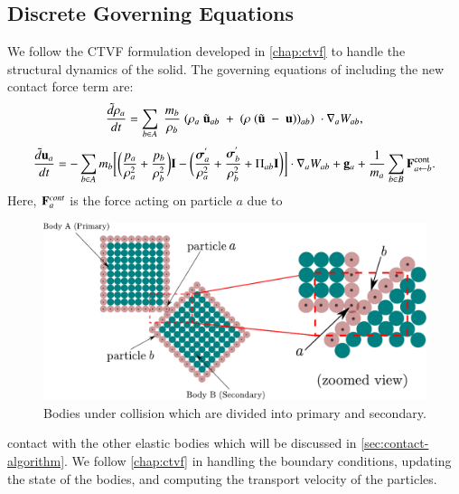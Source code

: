 \subsection{Discrete Governing Equations}
\label{sec:discrete-governing-equations}
We follow the CTVF formulation developed in \cref{chap:ctvf} to handle the
structural dynamics of the solid. The governing equations of including the new
contact force term are:
\begin{equation}
\label{eqn:sph-continuity}
  \frac{\tilde{d}\rho_a}{dt} = \sum_{b \in A} \; \frac{m_b}{\rho_{b}} \; (
  \rho_{a} \; \tilde{\mathbf{u}}_{ab} \; + \;
  (\rho \; (\tilde{\mathbf{u}} \; - \;
  \mathbf{u}))_{ab}) \; \cdot \nabla_{a} W_{ab},
\end{equation}
\begin{equation}
\label{eqn:sph-momentum}
  \frac{\tilde{d}\mathbf{u}_{a}}{dt} = - \sum_{b \in A} m_b \bigg[
  \bigg(\frac{p_a}{\rho_a^2} + \frac{p_b}{\rho_b^2}\bigg) \mathbf{I} -
  \bigg(\frac{\boldsymbol{\sigma}^{'}_{a}}{\rho_a^2} +
  \frac{\boldsymbol{\sigma}^{'}_{b}}{\rho_b^2} + \Pi_{ab} \mathbf{I} \bigg) \bigg]  \cdot \nabla_{a} W_{ab} +
  \mathbf{g}_{a} + \frac{1}{m_a}\sum_{b \in B} \mathbf{F}^{\text{cont}}_{a \leftarrow b}.
\end{equation}
Here, $\mathbf{F}^{cont}_{a}$ is the force acting on particle $a$ due to
\begin{figure}[!htpb]
  \centering
  \includegraphics[width=1.0\textwidth]{images/csph/images/contact_force/contact_force_description}
  \caption{Bodies under collision which are divided into primary and
    secondary.}
\label{fig:bodies_under_collision}
\end{figure}
contact with the other elastic bodies which will be discussed in
\cref{sec:contact-algorithm}. We follow \cref{chap:ctvf} in handling the
boundary conditions, updating the state of the bodies, and computing the
transport velocity of the particles.


\FloatBarrier%
